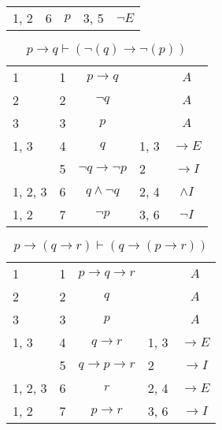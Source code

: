 \documentclass{article}
\begin{document}
\begin{table}[htbp]
\begin{tabular}{lrlll}
{1, 2} & 6 & $$p$$ & {3, 5} & $$¬E$$ \\
\end{tabular}
\end{table}\begin{table}[htbp]\caption*{$p→q ⊢ (¬(q)→ ¬(p))$}\centering\begin{tabular}{lrlll}
{1} & 1 & $$p→q$$ & {} & $$A$$ \\
{2} & 2 & $$¬q$$ & {} & $$A$$ \\
{3} & 3 & $$p$$ & {} & $$A$$ \\
{1, 3} & 4 & $$q$$ & {1, 3} & $$→E$$ \\
{} & 5 & $$¬q→ ¬p$$ & {2} & $$→I$$ \\
{1, 2, 3} & 6 & $$q∧ ¬q$$ & {2, 4} & $$∧I$$ \\
{1, 2} & 7 & $$¬p$$ & {3, 6} & $$¬I$$ \\
\end{tabular}
\end{table}\begin{table}[htbp]\caption*{$p→(q→r) ⊢ (q→(p→r))$}\centering\begin{tabular}{lrlll}
{1} & 1 & $$p→q→r$$ & {} & $$A$$ \\
{2} & 2 & $$q$$ & {} & $$A$$ \\
{3} & 3 & $$p$$ & {} & $$A$$ \\
{1, 3} & 4 & $$q→r$$ & {1, 3} & $$→E$$ \\
{} & 5 & $$q→p→r$$ & {2} & $$→I$$ \\
{1, 2, 3} & 6 & $$r$$ & {2, 4} & $$→E$$ \\
{1, 2} & 7 & $$p→r$$ & {3, 6} & $$→I$$ \\
\end{tabular}
\end{table}
\end{document}
